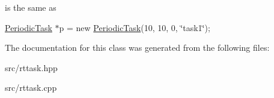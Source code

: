 is the same as


\begin{DoxyItemize}
\item \hyperlink{classRTSim_1_1PeriodicTask}{Periodic\+Task} $\ast$p = new \hyperlink{classRTSim_1_1PeriodicTask}{Periodic\+Task}(10, 10, 0, \char`\"{}task1\char`\"{}); 
\end{DoxyItemize}

The documentation for this class was generated from the following files\+:\begin{DoxyCompactItemize}
\item 
src/rttask.\+hpp\item 
src/rttask.\+cpp\end{DoxyCompactItemize}
